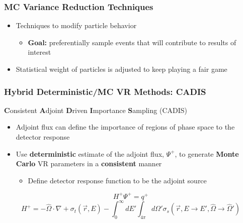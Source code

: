 \documentclass{beamer}
\begin{document}
\begin{frame}
\frametitle{MC Variance Reduction Techniques}
\begin{itemize}
\item{Techniques to modify particle behavior}
\begin{itemize}
	\item{\textbf{Goal:} preferentially sample events that will contribute to results of interest}
\end{itemize}
\item{Statistical weight of particles is adjusted to keep playing a fair game}
\end{itemize}
\end{frame}

\begin{frame}
\frametitle{Hybrid Deterministic/MC VR Methods: CADIS}
	\begin{block}{\textbf{C}onsistent \textbf{A}djoint \textbf{D}riven
	\textbf{I}mportance \textbf{S}ampling (CADIS)}
\begin{itemize}
\item{Adjoint flux can define the importance of regions of phase space to the detector response}
\item{Use \textbf{deterministic} estimate of the adjoint flux, $\Psi^+$, to
	generate \textbf{Monte Carlo} VR parameters in a \textbf{consistent}
		manner}
    \begin{itemize}
    \item{Define detector response function to be the adjoint source}
    \end{itemize}
\end{itemize}


\vspace{0.2cm}
       \begin{equation}
        H^+\Psi^+ = q^+
       \end{equation} 
       \begin{equation}
	H^{+} = -\widehat{\Omega} \cdot \nabla +
	    \sigma_{t}(\overrightarrow{r},E) - 
		\int_{0}^{\infty} dE'
		\int_{4\pi} d\Omega'
		\sigma_{s}( \overrightarrow{r}, E 
		\rightarrow E', \widehat{\Omega} 
		\rightarrow \widehat{\Omega}' )
       \end{equation}
\end{block}
\end{frame}
\end{document}
